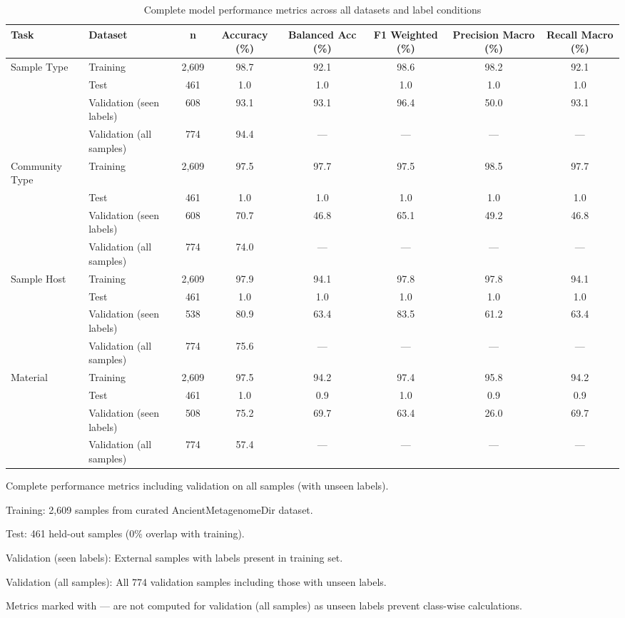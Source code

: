 \begin{table}[!t]
\caption{Complete model performance metrics across all datasets and label conditions\label{tab:supplementary_s1}}
\begin{tabular*}{\textwidth}{@{\extracolsep{\fill}}llcccccc@{\extracolsep{\fill}}}
\toprule
Task & Dataset & n & Accuracy (\%) & Balanced Acc (\%) & F1 Weighted (\%) & Precision Macro (\%) & Recall Macro (\%) \\
\midrule
Sample Type & Training & 2,609 & 98.7 & 92.1 & 98.6 & 98.2 & 92.1 \\
 & Test & 461 & 1.0 & 1.0 & 1.0 & 1.0 & 1.0 \\
 & Validation (seen labels) & 608 & 93.1 & 93.1 & 96.4 & 50.0 & 93.1 \\
 & Validation (all samples) & 774 & 94.4 & — & — & — & — \\
\addlinespace
Community Type & Training & 2,609 & 97.5 & 97.7 & 97.5 & 98.5 & 97.7 \\
 & Test & 461 & 1.0 & 1.0 & 1.0 & 1.0 & 1.0 \\
 & Validation (seen labels) & 608 & 70.7 & 46.8 & 65.1 & 49.2 & 46.8 \\
 & Validation (all samples) & 774 & 74.0 & — & — & — & — \\
\addlinespace
Sample Host & Training & 2,609 & 97.9 & 94.1 & 97.8 & 97.8 & 94.1 \\
 & Test & 461 & 1.0 & 1.0 & 1.0 & 1.0 & 1.0 \\
 & Validation (seen labels) & 538 & 80.9 & 63.4 & 83.5 & 61.2 & 63.4 \\
 & Validation (all samples) & 774 & 75.6 & — & — & — & — \\
\addlinespace
Material & Training & 2,609 & 97.5 & 94.2 & 97.4 & 95.8 & 94.2 \\
 & Test & 461 & 1.0 & 0.9 & 1.0 & 0.9 & 0.9 \\
 & Validation (seen labels) & 508 & 75.2 & 69.7 & 63.4 & 26.0 & 69.7 \\
 & Validation (all samples) & 774 & 57.4 & — & — & — & — \\
\bottomrule
\end{tabular*}
\begin{tablenotes}
\item Complete performance metrics including validation on all samples (with unseen labels).
\item Training: 2,609 samples from curated AncientMetagenomeDir dataset.
\item Test: 461 held-out samples (0\% overlap with training).
\item Validation (seen labels): External samples with labels present in training set.
\item Validation (all samples): All 774 validation samples including those with unseen labels.
\item Metrics marked with — are not computed for validation (all samples) as unseen labels prevent class-wise calculations.
\end{tablenotes}
\end{table}
